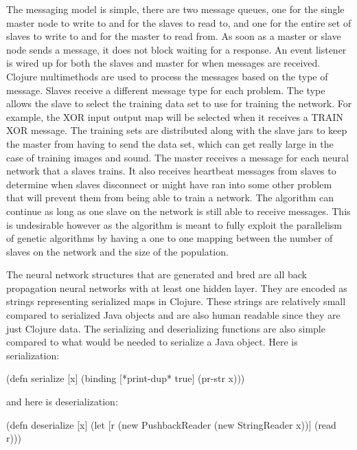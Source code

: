 The messaging model is simple, there are two message queues, one for the single master node to write to and for the slaves to read to, and one for the entire set of slaves to write to and for the master to read from. As soon as a master or slave node sends a message, it does not block waiting for a response. An event listener is wired up for both the slaves and master for when messages are received. Clojure multimethods are used to process the messages based on the type of message. Slaves receive a different message type for each problem. The type allows the slave to select the training data set to use for training the network. For example, the XOR input output map will be selected when it receives a TRAIN XOR message. The training sets are distributed along with the slave jars to keep the master from having to send the data set, which can get really large in the case of training images and sound. The master receives a message for each neural network that a slaves trains. It also receives heartbeat messages from slaves to determine when slaves disconnect or might have ran into some other problem that will prevent them from being able to train a network. The algorithm can continue as long as one slave on the network is still able to receive messages. This is undesirable however as the algorithm is meant to fully exploit the parallelism of genetic algorithms by having a one to one mapping between the number of slaves on the network and the size of the population. 

The neural network structures that are generated and bred are all back propagation neural networks with at least one hidden layer. They are encoded as strings representing serialized maps in Clojure. These strings are relatively small compared to serialized Java objects and are also human readable since they are just Clojure data. The serializing and deserializing functions are also simple compared to what would be needed to serialize a Java object. Here is serialization: 

(defn serialize [x]
  (binding [*print-dup* true] (pr-str x)))

and here is deserialization:

(defn deserialize [x]
  (let [r (new PushbackReader (new StringReader x))]
    (read r)))



